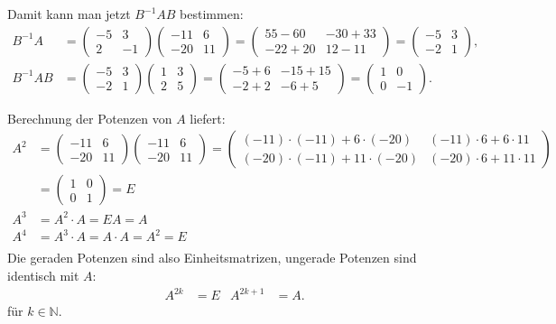 \begin{loesung}
\begin{teilaufgaben}
Damit kann man jetzt $B^{-1}AB$ bestimmen:
\begin{align*}
B^{-1}A
&=
\begin{pmatrix}-5&3\\2&-1\end{pmatrix}
\begin{pmatrix} -11&6\\ -20&11 \end{pmatrix}
=
\begin{pmatrix}
55-60&-30+33\\
-22+20&12-11
\end{pmatrix}
=
\begin{pmatrix}
-5&3\\
-2&1
\end{pmatrix},
\\
B^{-1}AB
&=
\begin{pmatrix}
-5&3\\
-2&1
\end{pmatrix}
\begin{pmatrix}
1&3\\
2&5
\end{pmatrix}
=
\begin{pmatrix}
-5+6&-15+15\\
-2+2&-6+5
\end{pmatrix}
=\begin{pmatrix}
1&0\\
0&-1
\end{pmatrix}.
\end{align*}

\item
Berechnung der Potenzen von $A$ liefert:
\begin{align*}
A^2
&=
\begin{pmatrix} -11&6\\-20&11\end{pmatrix}
\begin{pmatrix} -11&6\\-20&11\end{pmatrix}
=\begin{pmatrix}
(-11)\cdot(-11)+6\cdot(-20)&(-11)\cdot 6+6\cdot 11\\
(-20)\cdot(-11)+11\cdot(-20)&(-20)\cdot 6+11\cdot 11
\end{pmatrix}
\\
&=\begin{pmatrix}1&0\\0&1\end{pmatrix}=E\\
A^3&=A^2\cdot A=EA=A\\
A^4&=A^3\cdot A=A\cdot A=A^2=E\\
\end{align*}
Die geraden Potenzen sind also Einheitsmatrizen, ungerade 
Potenzen sind identisch mit $A$:
\begin{align*}
A^{2k}&=E&A^{2k+1}&=A.
\end{align*}
für $k\in \mathbb N$.
\qedhere
\end{teilaufgaben}
\end{loesung}
